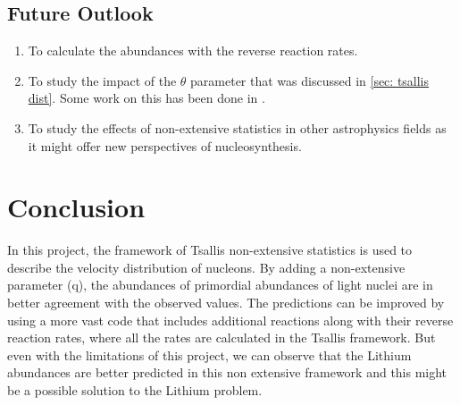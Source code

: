 \documentclass[11pt]{article}
\numberwithin{equation}{section}
\begin{document}
\subsection{Future Outlook}
\begin{enumerate}
    \item To calculate the abundances with the reverse reaction rates.

    \item To study the impact of the $\theta$ parameter that was discussed in \autoref{sec: tsallis dist}. Some work on this has been done in \citep{Kusakabe:2018dzx}.

    \item To study the effects of non-extensive statistics in other astrophysics fields as it might offer new perspectives of nucleosynthesis.

\end{enumerate}
\pagebreak

\section{Conclusion}
In this project, the framework of Tsallis non-extensive statistics is used to describe the velocity distribution of nucleons. By adding a non-extensive parameter (q), the abundances of primordial abundances of light nuclei are in better agreement with the observed values. The predictions can be improved by using a more vast code that includes additional reactions along with their reverse reaction rates, where all the rates are calculated in the Tsallis framework. But even with the limitations of this project, we can observe that the Lithium abundances are better predicted in this non extensive framework and this might be a possible solution to the Lithium problem.

 



\pagebreak
{}



\end{document}

